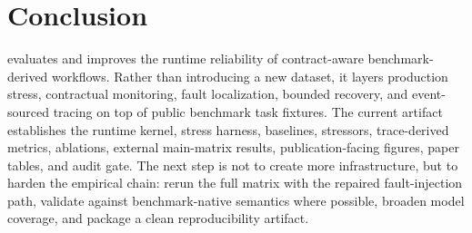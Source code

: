 \section{Conclusion}

\system evaluates and improves the runtime reliability of contract-aware benchmark-derived workflows. Rather than introducing a new dataset, it layers production stress, contractual monitoring, fault localization, bounded recovery, and event-sourced tracing on top of public benchmark task fixtures. The current artifact establishes the runtime kernel, stress harness, baselines, stressors, trace-derived metrics, ablations, external main-matrix results, publication-facing figures, paper tables, and audit gate. The next step is not to create more infrastructure, but to harden the empirical chain: rerun the full matrix with the repaired fault-injection path, validate against benchmark-native semantics where possible, broaden model coverage, and package a clean reproducibility artifact.
